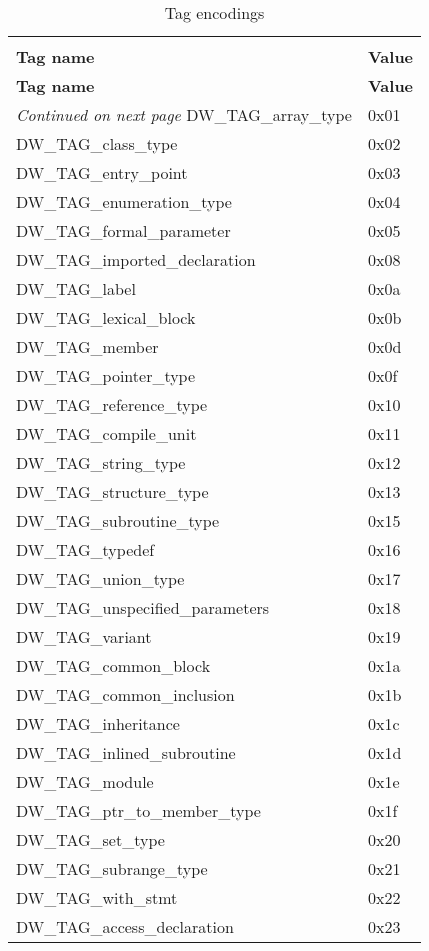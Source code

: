 \begin{centering}
\setlength{\extrarowheight}{0.1cm}
\begin{longtable}{l|l}
  \caption{Tag encodings} \label{tab:tagencodings} \\
  \hline \\ \bfseries Tag name&\bfseries Value\\ \hline
\endfirsthead
  \bfseries Tag name&\bfseries Value \\ \hline
\endhead
  \hline \emph{Continued on next page}
\endfoot
  \hline
\endlastfoot
DW\_TAG\_array\_type &0x01 \\
DW\_TAG\_class\_type&0x02 \\
DW\_TAG\_entry\_point&0x03 \\
DW\_TAG\_enumeration\_type&0x04 \\
DW\_TAG\_formal\_parameter&0x05 \\
DW\_TAG\_imported\_declaration&0x08 \\
DW\_TAG\_label&0x0a \\
DW\_TAG\_lexical\_block&0x0b \\
DW\_TAG\_member&0x0d \\
DW\_TAG\_pointer\_type&0x0f \\
DW\_TAG\_reference\_type&0x10 \\
DW\_TAG\_compile\_unit&0x11 \\
DW\_TAG\_string\_type&0x12 \\
DW\_TAG\_structure\_type&0x13 \\
DW\_TAG\_subroutine\_type&0x15 \\
DW\_TAG\_typedef&0x16 \\
DW\_TAG\_union\_type&0x17 \\
DW\_TAG\_unspecified\_parameters&0x18  \\
DW\_TAG\_variant&0x19  \\
DW\_TAG\_common\_block&0x1a  \\
DW\_TAG\_common\_inclusion&0x1b  \\
DW\_TAG\_inheritance&0x1c  \\
DW\_TAG\_inlined\_subroutine&0x1d  \\
DW\_TAG\_module&0x1e  \\
DW\_TAG\_ptr\_to\_member\_type&0x1f  \\
DW\_TAG\_set\_type&0x20  \\
DW\_TAG\_subrange\_type&0x21  \\
DW\_TAG\_with\_stmt&0x22  \\
DW\_TAG\_access\_declaration&0x23  \\

\end{longtable}
\end{centering}
